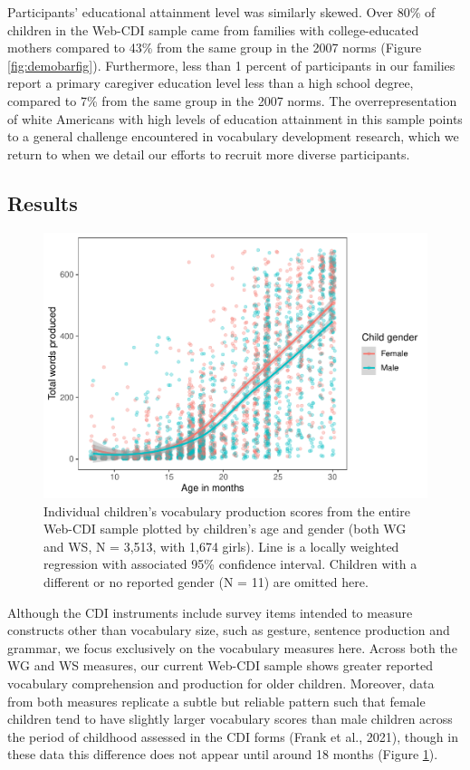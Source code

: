 \documentclass[
  english,
  ,man,floatsintext]{apa6}
\begin{document}
Participants' educational attainment level was similarly skewed. Over 80\% of children in the Web-CDI sample came from families with college-educated mothers compared to 43\% from the same group in the 2007 norms (Figure \ref{fig:demobarfig}). Furthermore, less than 1 percent of participants in our families report a primary caregiver education level less than a high school degree, compared to 7\% from the same group in the 2007 norms. The overrepresentation of white Americans with high levels of education attainment in this sample points to a general challenge encountered in vocabulary development research, which we return to when we detail our efforts to recruit more diverse participants.

\hypertarget{results}{%
\subsection{Results}\label{results}}

\begin{figure}
\centering
\includegraphics{webcdi_paper_files/figure-latex/genderfig-1.pdf}
\caption{\label{fig:genderfig}Individual children's vocabulary production scores from the entire Web-CDI sample plotted by children's age and gender (both WG and WS, N = 3,513, with 1,674 girls). Line is a locally weighted regression with associated 95\% confidence interval. Children with a different or no reported gender (N = 11) are omitted here.}
\end{figure}

Although the CDI instruments include survey items intended to measure constructs other than vocabulary size, such as gesture, sentence production and grammar, we focus exclusively on the vocabulary measures here. Across both the WG and WS measures, our current Web-CDI sample shows greater reported vocabulary comprehension and production for older children. Moreover, data from both measures replicate a subtle but reliable pattern such that female children tend to have slightly larger vocabulary scores than male children across the period of childhood assessed in the CDI forms (Frank et al., 2021), though in these data this difference does not appear until around 18 months (Figure \ref{fig:genderfig}).
\end{document}
